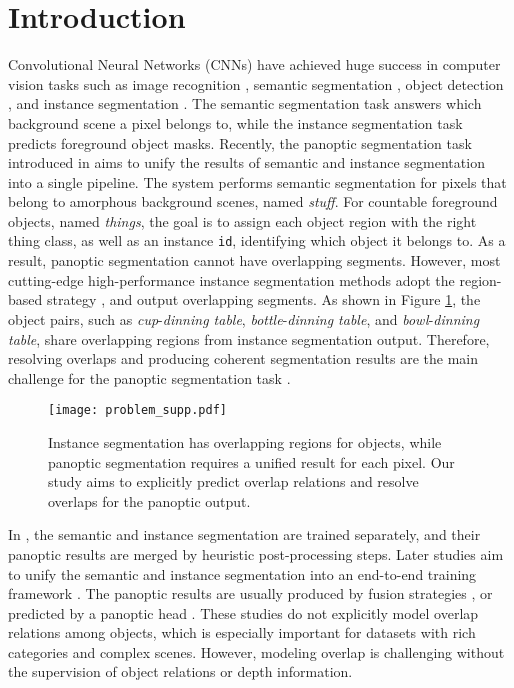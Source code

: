 \documentclass[letterpaper]{article} \usepackage{aaai20}  \usepackage{times}  \usepackage{helvet} \usepackage{courier}  \usepackage[hyphens]{url}  \usepackage{graphicx} \urlstyle{rm} \def\UrlFont{\rm}  \usepackage{graphicx}  \frenchspacing  \setlength{\pdfpagewidth}{8.5in}  \setlength{\pdfpageheight}{11in}
\begin{document}
\section{Introduction}
Convolutional Neural Networks (CNNs) have achieved huge success in computer vision tasks such as image recognition \cite{he2016deep,yang2018convolutional}, semantic segmentation \cite{long2015fully,chen2018deeplab}, object detection \cite{girshick2015fast,ren2015faster}, and instance segmentation \cite{he2017mask}. The semantic segmentation task answers which background scene a pixel belongs to, while the instance segmentation task predicts foreground object masks. Recently, the panoptic segmentation task introduced in \cite{kirillov2018panoptic} aims to unify the results of semantic and instance segmentation into a single pipeline. The system performs semantic segmentation for pixels that belong to amorphous background scenes, named \emph{stuff}. For countable foreground objects, named \emph{things}, the goal is to assign each object region with the right thing class, as well as an instance \verb|id|, identifying which object it belongs to. As a result, panoptic segmentation cannot have overlapping segments. However, most cutting-edge high-performance instance segmentation methods \cite{he2017mask} adopt the region-based strategy \cite{girshick2014rich}, and output overlapping segments. As shown in Figure \ref{fig1}, the object pairs, such as \emph{cup}-\emph{dinning table}, \emph{bottle}-\emph{dinning table}, and \emph{bowl}-\emph{dinning table}, share overlapping regions from instance segmentation output. Therefore, resolving overlaps and producing coherent segmentation results are the main challenge for the panoptic segmentation task \cite{kirillov2018panoptic}. 



\begin{figure}[t!]
\texttt{[image: problem\_supp.pdf]}
\caption{Instance segmentation has overlapping regions for objects, while panoptic segmentation requires a unified result for each pixel. Our study aims to explicitly predict overlap relations and resolve overlaps for the panoptic output.}
	\label{fig1}
\end{figure}



In \cite{kirillov2018panoptic}, the semantic and instance segmentation are trained separately, and their panoptic results are merged by heuristic post-processing steps. Later studies aim to unify the semantic and instance segmentation into an end-to-end training framework \cite{kirillov2019panoptic,li2018attention,liu2019end,xiong2019upsnet,mapillary,yang2019deeperlab,li2018learning}. The panoptic results are usually produced by fusion strategies \cite{kirillov2019panoptic,li2018attention}, or predicted by a panoptic head \cite{liu2019end,xiong2019upsnet}. These studies do not explicitly model overlap relations among objects, which is especially important for datasets with rich categories and complex scenes. However, modeling overlap is challenging without the supervision of object relations or depth information. 
\end{document}
